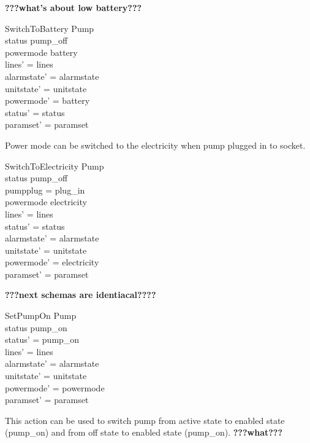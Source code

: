 \documentclass{article}
\begin{document}
\textbf{???what's about low battery???}
	\begin{schema}{SwitchToBattery}
		\Delta Pump \\
	\where 
		status \neq pump\_off \\
		powermode \neq battery\\
		lines' = lines \\
		alarmstate' = alarmstate \\
		unitstate' = unitstate \\
		powermode' = battery \\
		status' = status \\
		paramset' = paramset \\
	\end{schema}
	
		Power mode can be switched to the electricity when pump plugged in to socket.
	
	\begin{schema}{SwitchToElectricity}
		\Delta Pump \\
	\where 
		status \neq pump\_off \\
		pumpplug = plug\_in \\
		powermode \neq electricity \\
		lines' = lines \\
		status' = status \\
		alarmstate' = alarmstate \\
		unitstate' = unitstate \\
		powermode' = electricity \\
		paramset' = paramset \\
	\end{schema}
	

\textbf{???next schemas are identiacal????}
	\begin{schema}{SetPumpOn}
		\Delta Pump \\
	\where 
		status \neq pump\_on \\
		status' = pump\_on \\
		lines' = lines \\
    	alarmstate' = alarmstate \\
    	unitstate' = unitstate \\
    	powermode' = powermode \\
		paramset' = paramset
	\end{schema}
	
	This action can be used to switch pump from active state to enabled state (pump\_on) and from off state to enabled state (pump\_on).
	\textbf{???what???}
	
\end{document}

